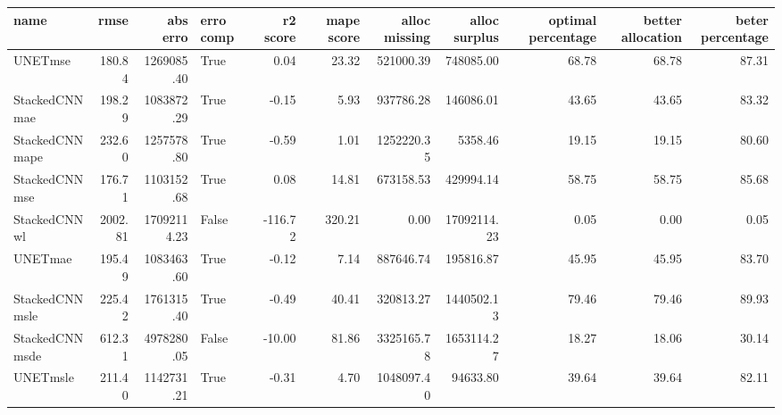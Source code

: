 \begin{tabular}{lrrlrrrrrrr}
\toprule
name & rmse & abs erro & erro comp & r2 score & mape score & alloc missing & alloc surplus & optimal percentage & better allocation & beter percentage \\
\midrule
UNETmse & 180.84 & 1269085.40 & True & 0.04 & 23.32 & 521000.39 & 748085.00 & 68.78 & 68.78 & 87.31 \\
StackedCNNmae & 198.29 & 1083872.29 & True & -0.15 & 5.93 & 937786.28 & 146086.01 & 43.65 & 43.65 & 83.32 \\
StackedCNNmape & 232.60 & 1257578.80 & True & -0.59 & 1.01 & 1252220.35 & 5358.46 & 19.15 & 19.15 & 80.60 \\
StackedCNNmse & 176.71 & 1103152.68 & True & 0.08 & 14.81 & 673158.53 & 429994.14 & 58.75 & 58.75 & 85.68 \\
StackedCNNwl & 2002.81 & 17092114.23 & False & -116.72 & 320.21 & 0.00 & 17092114.23 & 0.05 & 0.00 & 0.05 \\
UNETmae & 195.49 & 1083463.60 & True & -0.12 & 7.14 & 887646.74 & 195816.87 & 45.95 & 45.95 & 83.70 \\
StackedCNNmsle & 225.42 & 1761315.40 & True & -0.49 & 40.41 & 320813.27 & 1440502.13 & 79.46 & 79.46 & 89.93 \\
StackedCNNmsde & 612.31 & 4978280.05 & False & -10.00 & 81.86 & 3325165.78 & 1653114.27 & 18.27 & 18.06 & 30.14 \\
UNETmsle & 211.40 & 1142731.21 & True & -0.31 & 4.70 & 1048097.40 & 94633.80 & 39.64 & 39.64 & 82.11 \\
\bottomrule
\end{tabular}
